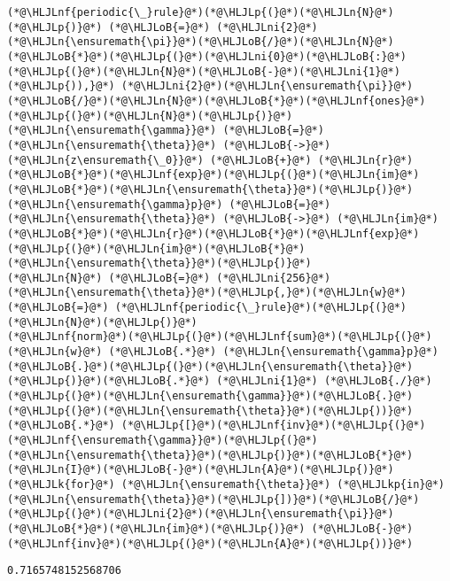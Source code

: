 \documentclass[12pt,landscape]{article}
\newcommand{\HLJLk}[1]{\textcolor[RGB]{148,91,176}{\textbf{#1}}}
\newcommand{\HLJLkp}[1]{\textcolor[RGB]{148,91,176}{\textbf{#1}}}
\newcommand{\HLJLn}[1]{#1}
\newcommand{\HLJLnf}[1]{\textcolor[RGB]{66,102,213}{#1}}
\newcommand{\HLJLni}[1]{\textcolor[RGB]{59,151,46}{#1}}
\newcommand{\HLJLoB}[1]{\textcolor[RGB]{102,102,102}{\textbf{#1}}}
\newcommand{\HLJLp}[1]{#1}
\begin{document}
{\begin{lstlisting}
(*@\HLJLnf{periodic{\_}rule}@*)(*@\HLJLp{(}@*)(*@\HLJLn{N}@*)(*@\HLJLp{)}@*) (*@\HLJLoB{=}@*) (*@\HLJLni{2}@*)(*@\HLJLn{\ensuremath{\pi}}@*)(*@\HLJLoB{/}@*)(*@\HLJLn{N}@*)(*@\HLJLoB{*}@*)(*@\HLJLp{(}@*)(*@\HLJLni{0}@*)(*@\HLJLoB{:}@*)(*@\HLJLp{(}@*)(*@\HLJLn{N}@*)(*@\HLJLoB{-}@*)(*@\HLJLni{1}@*)(*@\HLJLp{)),}@*) (*@\HLJLni{2}@*)(*@\HLJLn{\ensuremath{\pi}}@*)(*@\HLJLoB{/}@*)(*@\HLJLn{N}@*)(*@\HLJLoB{*}@*)(*@\HLJLnf{ones}@*)(*@\HLJLp{(}@*)(*@\HLJLn{N}@*)(*@\HLJLp{)}@*)
(*@\HLJLn{\ensuremath{\gamma}}@*) (*@\HLJLoB{=}@*) (*@\HLJLn{\ensuremath{\theta}}@*) (*@\HLJLoB{->}@*) (*@\HLJLn{z\ensuremath{\_0}}@*) (*@\HLJLoB{+}@*) (*@\HLJLn{r}@*)(*@\HLJLoB{*}@*)(*@\HLJLnf{exp}@*)(*@\HLJLp{(}@*)(*@\HLJLn{im}@*)(*@\HLJLoB{*}@*)(*@\HLJLn{\ensuremath{\theta}}@*)(*@\HLJLp{)}@*)
(*@\HLJLn{\ensuremath{\gamma}p}@*) (*@\HLJLoB{=}@*) (*@\HLJLn{\ensuremath{\theta}}@*) (*@\HLJLoB{->}@*) (*@\HLJLn{im}@*)(*@\HLJLoB{*}@*)(*@\HLJLn{r}@*)(*@\HLJLoB{*}@*)(*@\HLJLnf{exp}@*)(*@\HLJLp{(}@*)(*@\HLJLn{im}@*)(*@\HLJLoB{*}@*)(*@\HLJLn{\ensuremath{\theta}}@*)(*@\HLJLp{)}@*)
(*@\HLJLn{N}@*) (*@\HLJLoB{=}@*) (*@\HLJLni{256}@*)
(*@\HLJLn{\ensuremath{\theta}}@*)(*@\HLJLp{,}@*)(*@\HLJLn{w}@*) (*@\HLJLoB{=}@*) (*@\HLJLnf{periodic{\_}rule}@*)(*@\HLJLp{(}@*)(*@\HLJLn{N}@*)(*@\HLJLp{)}@*)
(*@\HLJLnf{norm}@*)(*@\HLJLp{(}@*)(*@\HLJLnf{sum}@*)(*@\HLJLp{(}@*)(*@\HLJLn{w}@*) (*@\HLJLoB{.*}@*) (*@\HLJLn{\ensuremath{\gamma}p}@*)(*@\HLJLoB{.}@*)(*@\HLJLp{(}@*)(*@\HLJLn{\ensuremath{\theta}}@*)(*@\HLJLp{)}@*)(*@\HLJLoB{.*}@*) (*@\HLJLni{1}@*) (*@\HLJLoB{./}@*)(*@\HLJLp{(}@*)(*@\HLJLn{\ensuremath{\gamma}}@*)(*@\HLJLoB{.}@*)(*@\HLJLp{(}@*)(*@\HLJLn{\ensuremath{\theta}}@*)(*@\HLJLp{))}@*) (*@\HLJLoB{.*}@*) (*@\HLJLp{[}@*)(*@\HLJLnf{inv}@*)(*@\HLJLp{(}@*)(*@\HLJLnf{\ensuremath{\gamma}}@*)(*@\HLJLp{(}@*)(*@\HLJLn{\ensuremath{\theta}}@*)(*@\HLJLp{)}@*)(*@\HLJLoB{*}@*)(*@\HLJLn{I}@*)(*@\HLJLoB{-}@*)(*@\HLJLn{A}@*)(*@\HLJLp{)}@*) (*@\HLJLk{for}@*) (*@\HLJLn{\ensuremath{\theta}}@*) (*@\HLJLkp{in}@*) (*@\HLJLn{\ensuremath{\theta}}@*)(*@\HLJLp{])}@*)(*@\HLJLoB{/}@*)(*@\HLJLp{(}@*)(*@\HLJLni{2}@*)(*@\HLJLn{\ensuremath{\pi}}@*)(*@\HLJLoB{*}@*)(*@\HLJLn{im}@*)(*@\HLJLp{)}@*) (*@\HLJLoB{-}@*) (*@\HLJLnf{inv}@*)(*@\HLJLp{(}@*)(*@\HLJLn{A}@*)(*@\HLJLp{))}@*)
\end{lstlisting}

\begin{lstlisting}
0.7165748152568706
\end{lstlisting}


}
\end{document}
